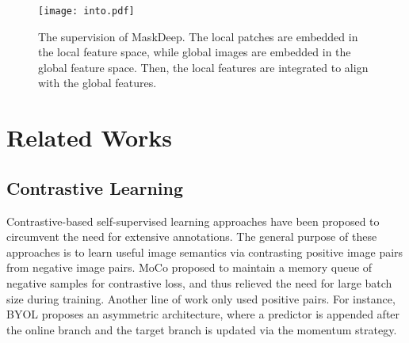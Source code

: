 \documentclass[10pt,twocolumn,letterpaper]{article}
\begin{document}
\begin{figure*}[t]
     \centering   
    \texttt{[image: into.pdf]}
     \caption{The supervision of MaskDeep. The local patches are embedded in the local feature space, while global images are embedded in the global feature space. Then, the local features are integrated to align with the global features.}
     \label{fig:motivation}
\end{figure*}

\section{Related Works}
\subsection{Contrastive Learning}
Contrastive-based self-supervised learning approaches \cite{he2020momentum,chen2020improved,grill2020bootstrap,simclr,instancediscri,xie2021detco,wei2021aligning,densecl,insloc,wang2022repre,li2021supervision,shao2021intern} have been proposed to circumvent the need for extensive annotations. The general purpose of these approaches is to learn useful image semantics via contrasting positive image pairs from negative image pairs. MoCo \cite{he2020momentum} proposed to maintain a memory queue of negative samples for contrastive loss, and thus relieved the need for large batch size during training. 
Another line of work only used positive pairs. For instance, BYOL \cite{grill2020bootstrap} proposes an asymmetric architecture, where a predictor is appended after the online branch and the target branch is updated via the momentum strategy. 
\end{document}
